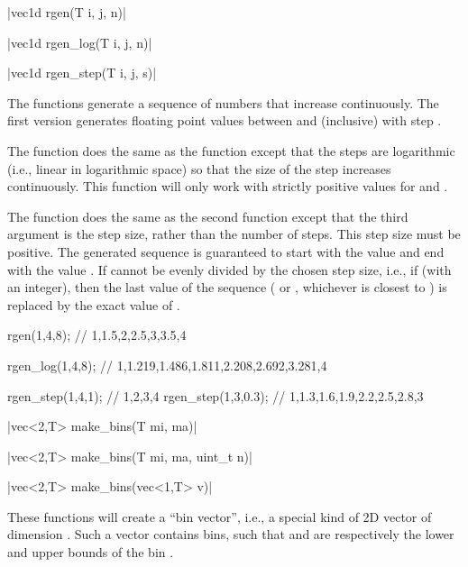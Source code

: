 \funcitem \cppinline|vec1d rgen(T i, j, n)| 

\cppinline|vec1d rgen_log(T i, j, n)| 

\cppinline|vec1d rgen_step(T i, j, s)| 

The  functions generate a sequence of numbers that increase continuously. The first version generates  floating point values between  and  (inclusive) with step .

The  function does the same as the  function except that the steps are logarithmic (i.e., linear in logarithmic space) so that the size of the step increases continuously. This function will only work with strictly positive values for  and .

The  function does the same as the second  function except that the third argument is the step size, rather than the number of steps. This step size must be positive. The generated sequence is guaranteed to start with the value  and end with the value . If  cannot be evenly divided by the chosen step size, i.e., if  (with  an integer), then the last value of the sequence ( or , whichever is closest to ) is replaced by the exact value of .

\begin{example}
\begin{cppcode}
rgen(1,4,8); // {1,1.5,2,2.5,3,3.5,4}

rgen_log(1,4,8); // {1,1.219,1.486,1.811,2.208,2.692,3.281,4}

rgen_step(1,4,1); // {1,2,3,4}
rgen_step(1,3,0.3); // {1,1.3,1.6,1.9,2.2,2.5,2.8,3}
\end{cppcode}
\end{example}

\funcitem \cppinline|vec<2,T> make_bins(T mi, ma)| 

\cppinline|vec<2,T> make_bins(T mi, ma, uint_t n)|

\cppinline|vec<2,T> make_bins(vec<1,T> v)|

These functions will create a ``bin vector'', i.e., a special kind of 2D vector of dimension \cppinline{[2,n]}. Such a vector contains  bins, such that  and  are respectively the lower and upper bounds of the bin .

